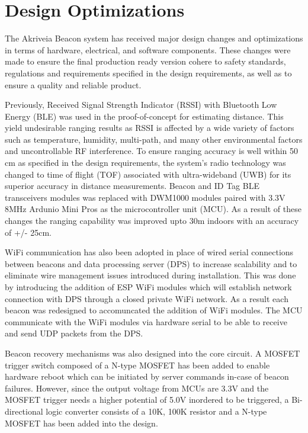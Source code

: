 

\setcounter{section}{1}
\section{Design Optimizations}

\bigskip
The Akriveia Beacon system has received major design changes and optimizations in terms of hardware, electrical, and software components. These changes were made to ensure the final production ready version cohere to safety standards, regulations  and requirements specified in the design requirements, as well as to ensure a quality and reliable product.

\bigskip
Previously, Received Signal Strength Indicator (RSSI) with Bluetooth Low Energy (BLE) was used in the proof-of-concept for estimating distance. This yield undesirable ranging results as RSSI is affected by a wide variety of factors such as temperature, humidity, multi-path, and many other environmental factors and uncontrollable RF interference. To ensure ranging accuracy is well within 50 cm as specified in the design requirements, the system's radio technology was changed to time of flight (TOF) associated with ultra-wideband (UWB) for its superior accuracy in distance measurements. Beacon and ID Tag BLE transceivers modules was replaced with DWM1000 modules paired with 3.3V 8MHz Ardunio Mini Pros as the microcontroller unit (MCU). As a result of these changes the ranging capability was improved upto 30m indoors with an accuracy of +/- 25cm. 

\bigskip
WiFi communication has also been adopted in place of wired serial connections between beacons and data processing server (DPS) to increase scalability and to eliminate wire management issues introduced during installation. This was done by introducing the addition of ESP WiFi modules which will establish network connection with DPS through a closed private WiFi network. As a result each beacon was redesigned to accomuncated the addition of WiFi modules. The MCU communicate with the WiFi modules via hardware serial to be able to receive and send UDP packets from the DPS.

\bigskip
Beacon recovery mechanisms was also designed into the core circuit. A MOSFET trigger switch composed of a N-type MOSFET has been added to enable hardware reboot which can be initiated by server commands in-case of beacon failures. However, since the output voltage from MCUs are 3.3V and the MOSFET trigger needs a higher potential of 5.0V inordered to be triggered, a Bi-directional logic converter consists of a 10K, 100K resistor and a N-type MOSFET has been added into the design. 

